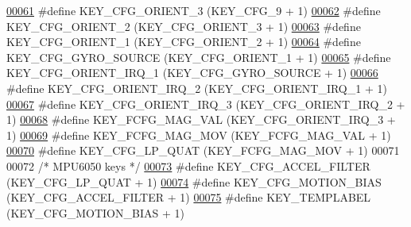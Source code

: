 \begin{DoxyCode}
\hypertarget{dmp_key_8h_source.tex_l00061}{}\hyperlink{dmp_key_8h_a4c2f4e94cf149b7e4d74bd531e33f363}{00061} \textcolor{preprocessor}{#define KEY\_CFG\_ORIENT\_3            (KEY\_CFG\_9 + 1)}
\hypertarget{dmp_key_8h_source.tex_l00062}{}\hyperlink{dmp_key_8h_a82b40f1055d41ed86fa0072fa9f76256}{00062} \textcolor{preprocessor}{#define KEY\_CFG\_ORIENT\_2            (KEY\_CFG\_ORIENT\_3 + 1)}
\hypertarget{dmp_key_8h_source.tex_l00063}{}\hyperlink{dmp_key_8h_a28f73c835e6c16e3998bc5daee542cc4}{00063} \textcolor{preprocessor}{#define KEY\_CFG\_ORIENT\_1            (KEY\_CFG\_ORIENT\_2 + 1)}
\hypertarget{dmp_key_8h_source.tex_l00064}{}\hyperlink{dmp_key_8h_ad6e6d13e3c7505e27e9cd310b7dc69f9}{00064} \textcolor{preprocessor}{#define KEY\_CFG\_GYRO\_SOURCE         (KEY\_CFG\_ORIENT\_1 + 1)}
\hypertarget{dmp_key_8h_source.tex_l00065}{}\hyperlink{dmp_key_8h_a214abdd061d834dbee6f8d804585cdd8}{00065} \textcolor{preprocessor}{#define KEY\_CFG\_ORIENT\_IRQ\_1        (KEY\_CFG\_GYRO\_SOURCE + 1)}
\hypertarget{dmp_key_8h_source.tex_l00066}{}\hyperlink{dmp_key_8h_a629f9aa58f13d9d70d82da360ef8a2ac}{00066} \textcolor{preprocessor}{#define KEY\_CFG\_ORIENT\_IRQ\_2        (KEY\_CFG\_ORIENT\_IRQ\_1 + 1)}
\hypertarget{dmp_key_8h_source.tex_l00067}{}\hyperlink{dmp_key_8h_a841eaa472f5eea819364b8a52e4f375d}{00067} \textcolor{preprocessor}{#define KEY\_CFG\_ORIENT\_IRQ\_3        (KEY\_CFG\_ORIENT\_IRQ\_2 + 1)}
\hypertarget{dmp_key_8h_source.tex_l00068}{}\hyperlink{dmp_key_8h_a5c00ed33c857436d4d62d4a43cc0551f}{00068} \textcolor{preprocessor}{#define KEY\_FCFG\_MAG\_VAL            (KEY\_CFG\_ORIENT\_IRQ\_3 + 1)}
\hypertarget{dmp_key_8h_source.tex_l00069}{}\hyperlink{dmp_key_8h_ad7299dd182e8feb57a9a5026d356cd5f}{00069} \textcolor{preprocessor}{#define KEY\_FCFG\_MAG\_MOV            (KEY\_FCFG\_MAG\_VAL + 1)}
\hypertarget{dmp_key_8h_source.tex_l00070}{}\hyperlink{dmp_key_8h_aa1976f8770a8d7a6fe33d911df1a7e71}{00070} \textcolor{preprocessor}{#define KEY\_CFG\_LP\_QUAT             (KEY\_FCFG\_MAG\_MOV + 1)}
00071 
00072 \textcolor{comment}{/* MPU6050 keys */}
\hypertarget{dmp_key_8h_source.tex_l00073}{}\hyperlink{dmp_key_8h_ac0902228305c8c231e322e1a25ac5ee7}{00073} \textcolor{preprocessor}{#define KEY\_CFG\_ACCEL\_FILTER        (KEY\_CFG\_LP\_QUAT + 1)}
\hypertarget{dmp_key_8h_source.tex_l00074}{}\hyperlink{dmp_key_8h_a941389ecdbed59f71ff7eda4e65291d5}{00074} \textcolor{preprocessor}{#define KEY\_CFG\_MOTION\_BIAS         (KEY\_CFG\_ACCEL\_FILTER + 1)}
\hypertarget{dmp_key_8h_source.tex_l00075}{}\hyperlink{dmp_key_8h_a57995608a071771b3bb0ac1ea29c1656}{00075} \textcolor{preprocessor}{#define KEY\_TEMPLABEL               (KEY\_CFG\_MOTION\_BIAS + 1)}

\end{DoxyCode}
